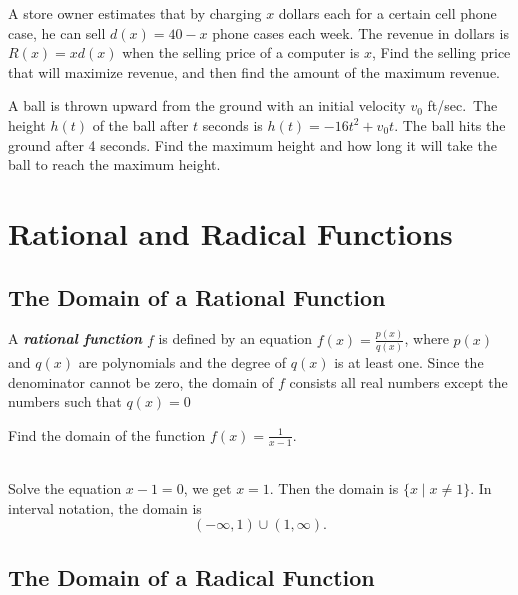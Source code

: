 \documentclass[en,12pt]{elegantbook}
\let\BeginKnitrBlock\begin \let\EndKnitrBlock\end
\begin{document}
\BeginKnitrBlock{exercise}
\protect\hypertarget{exr:unnamed-chunk-291}{}{\label{exr:unnamed-chunk-291} }
A store owner estimates that by charging \(x\) dollars each for a certain cell phone case, he can sell \(d(x)=40 - x\) phone cases each week. The revenue in dollars is \(R(x)=xd(x)\) when the selling price of a computer is \(x\), Find the selling price that will maximize revenue, and then find the amount of the maximum revenue.
\EndKnitrBlock{exercise}

\BeginKnitrBlock{exercise}
\protect\hypertarget{exr:unnamed-chunk-292}{}{\label{exr:unnamed-chunk-292} }
A ball is thrown upward from the ground with an initial velocity \(v_0\) ft/sec.~The height \(h(t)\) of the ball after \(t\) seconds is \(h(t)= -16t^2 + v_0t\). The ball hits the ground after 4 seconds.
Find the maximum height and how long it will take the ball to reach the maximum height.
\EndKnitrBlock{exercise}

\hypertarget{rational-and-radical-functions}{%
\chapter{Rational and Radical Functions}\label{rational-and-radical-functions}}

\hypertarget{the-domain-of-a-rational-function}{%
\section{The Domain of a Rational Function}\label{the-domain-of-a-rational-function}}

A \textbf{\emph{rational function}} \(f\) is defined by an equation \(f(x)=\frac{p(x)}{q(x)}\), where \(p(x)\) and \(q(x)\) are polynomials and the degree of \(q(x)\) is at least one. Since the denominator cannot be zero, the domain of \(f\) consists all real numbers except the numbers such that \(q(x)=0\)

\BeginKnitrBlock{example}
\protect\hypertarget{exm:unnamed-chunk-293}{}{\label{exm:unnamed-chunk-293} }
Find the domain of the function \(f(x)=\frac{1}{x-1}\).
\EndKnitrBlock{example}

\BeginKnitrBlock{solution}
{}\\

Solve the equation \(x-1=0\), we get \(x=1\). Then the domain is \(\{x\mid x\neq 1\}\). In interval notation, the domain is
\[
(-\infty, 1)\cup (1,\infty).
\]
\EndKnitrBlock{solution}

\hypertarget{the-domain-of-a-radical-function}{%
\section{The Domain of a Radical Function}\label{the-domain-of-a-radical-function}}
\end{document}
